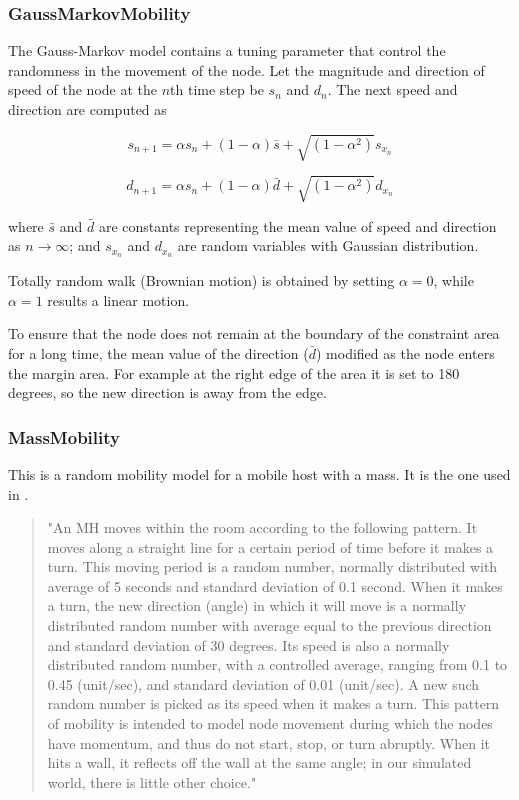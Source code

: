 \subsubsection*{GaussMarkovMobility}

The Gauss-Markov model contains a tuning parameter that control the randomness
in the movement of the node. Let the magnitude and direction of speed of the
node at the $n$th time step be $s_n$ and $d_n$. The next speed and direction are
computed as

$$ s_{n+1} = \alpha s_n + (1 - \alpha) \bar{s} + \sqrt{(1-\alpha^2)} s_{x_n} $$

$$ d_{n+1} = \alpha s_n + (1 - \alpha) \bar{d} + \sqrt{(1-\alpha^2)} d_{x_n} $$

where $\bar{s}$ and $\bar{d}$ are constants representing the mean value
of speed and direction as $n \to \infty$; and $s_{x_n}$ and $d_{x_n}$
are random variables with Gaussian distribution.

Totally random walk (Brownian motion) is obtained by setting $\alpha=0$,
while $\alpha=1$ results a linear motion.

To ensure that the node does not remain at the boundary of the constraint
area for a long time, the mean value of the direction ($\bar{d}$) modified
as the node enters the margin area. For example at the right edge of the
area it is set to 180 degrees, so the new direction is away from the edge.


\subsubsection*{MassMobility}

This is a random mobility model for a mobile host with
a mass. It is the one used in \cite{Perkins99optimizedsmooth}.

\begin{quote}
"An MH moves within the room according to the following pattern. It moves
along a straight line for a certain period of time before it makes a turn.
This moving period is a random number, normally distributed with average of
5 seconds and standard deviation of 0.1 second. When it makes a turn, the
new direction (angle) in which it will move is a normally distributed
random number with average equal to the previous direction and standard
deviation of 30 degrees. Its speed is also a normally distributed random
number, with a controlled average, ranging from 0.1 to 0.45 (unit/sec), and
standard deviation of 0.01 (unit/sec). A new such random number is picked
as its speed when it makes a turn. This pattern of mobility is intended to
model node movement during which the nodes have momentum, and thus do not
start, stop, or turn abruptly. When it hits a wall, it reflects off the
wall at the same angle; in our simulated world, there is little other
choice."
\end{quote}

